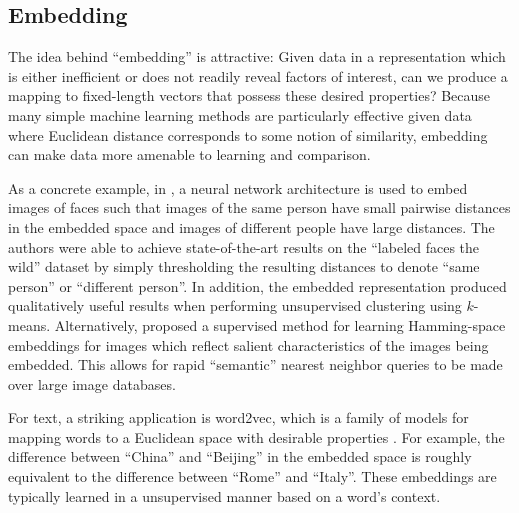 \subsection{Embedding}

The idea behind ``embedding'' is attractive: Given data in a representation which is either inefficient or does not readily reveal factors of interest, can we produce a mapping to fixed-length vectors that possess these desired properties?
Because many simple machine learning methods are particularly effective given data where Euclidean distance corresponds to some notion of similarity, embedding can make data more amenable to learning and comparison.

As a concrete example, in \cite{schroff2015facenet}, a neural network architecture is used to embed images of faces such that images of the same person have small pairwise distances in the embedded space and images of different people have large distances.
The authors were able to achieve state-of-the-art results on the ``labeled faces the wild'' dataset by simply thresholding the resulting distances to denote ``same person'' or ``different person''.
In addition, the embedded representation produced qualitatively useful results when performing unsupervised clustering using $k$-means.
Alternatively, \cite{yang2015supervised} proposed a supervised method for learning Hamming-space embeddings for images which reflect salient characteristics of the images being embedded.
This allows for rapid ``semantic'' nearest neighbor queries to be made over large image databases.

For text, a striking application is word2vec, which is a family of models for mapping words to a Euclidean space with desirable properties \cite{mikolov2013distributed}.
For example, the difference between ``China'' and ``Beijing'' in the embedded space is roughly equivalent to the difference between ``Rome'' and ``Italy''.
These embeddings are typically learned in a unsupervised manner based on a word's context.

